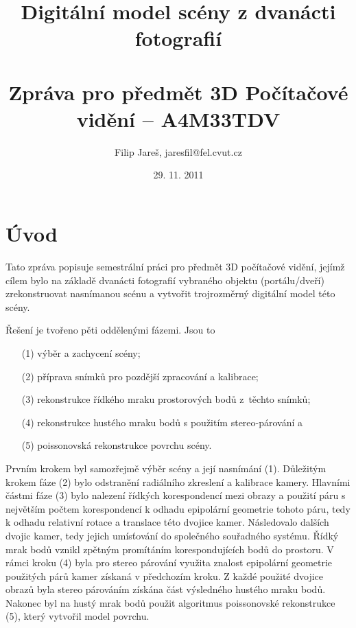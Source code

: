 \documentclass[11pt,oneside,a4paper,pdftex]{article}   %
\title{Digitální model scény z dvanácti fotografií \\ \ \\ \large Zpráva pro předmět 3D Počítačové vidění -- A4M33TDV}
\date{29. 11. 2011}
\author{Filip Jareš, jaresfil@fel.cvut.cz}
\begin{document}
\maketitle


\section*{Úvod}

	Tato zpráva popisuje semestrální práci pro předmět 3D počítačové vidění, jejímž cílem bylo na základě
	dvanácti fotografií vybraného objektu (portálu/dveří) zrekonstruovat nasnímanou scénu a vytvořit
	trojrozměrný digitální model této scény.
	
	Řešení je tvořeno pěti oddělenými fázemi. Jsou to
	\begin{enumerate}
		\item[(1)] výběr a zachycení scény;
		\item[(2)] příprava snímků pro pozdější zpracování a kalibrace;
		\item[(3)] rekonstrukce řídkého mraku prostorových bodů z~těchto snímků;
		\item[(4)] rekonstrukce hustého mraku bodů s použitím stereo-párování a
		\item[(5)] poissonovská rekonstrukce povrchu scény.
	\end{enumerate}
	
	Prvním krokem byl samozřejmě výběr scény a její nasnímání (1).  Důležitým krokem fáze (2) bylo
	odstranění radiálního zkreslení a kalibrace kamery. Hlavními částmi fáze (3) bylo nalezení řídkých
	korespondencí mezi obrazy a použití páru s největším počtem korespondencí k odhadu epipolární
	geometrie tohoto páru, tedy k odhadu relativní rotace a translace této dvojice kamer.  Následovalo
	 dalších dvojic kamer, tedy jejich umísťování do společného souřadného systému. Řídký
	mrak bodů vznikl zpětným promítáním korespondujících bodů do prostoru. V rámci kroku (4) byla pro
	stereo párování využita znalost epipolární geometrie použitých párů kamer získaná v předchozím
	kroku.  Z každé použité dvojice obrazů byla stereo párováním získána část výsledného hustého mraku
	bodů.  Nakonec byl na hustý mrak bodů použit algoritmus poissonovské rekonstrukce (5), který vytvořil
	model povrchu.
	
\end{document}
